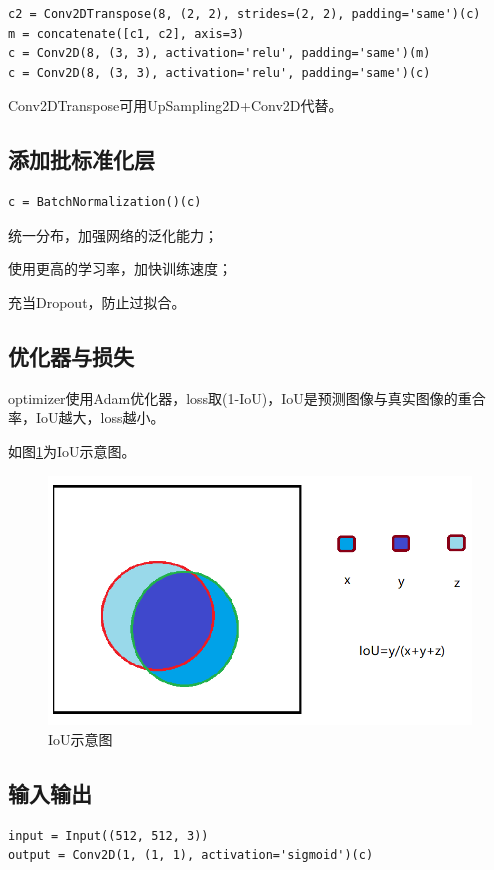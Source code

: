 \begin{lstlisting}
c2 = Conv2DTranspose(8, (2, 2), strides=(2, 2), padding='same')(c)
m = concatenate([c1, c2], axis=3)
c = Conv2D(8, (3, 3), activation='relu', padding='same')(m)
c = Conv2D(8, (3, 3), activation='relu', padding='same')(c)
\end{lstlisting}

Conv2DTranspose可用UpSampling2D+Conv2D代替。

\subsection{添加批标准化层}

\begin{lstlisting}
c = BatchNormalization()(c)
\end{lstlisting}

统一分布，加强网络的泛化能力；

使用更高的学习率，加快训练速度；

充当Dropout，防止过拟合。

\subsection{优化器与损失}

optimizer使用Adam优化器，loss取(1-IoU)，IoU是预测图像与真实图像的重合率，IoU越大，loss越小。

如图\ref{fig::model16}为IoU示意图。

\begin{figure}[htbp]
\centering
\includegraphics[width=0.6\linewidth]{body/model_pic/iou}
\caption{IoU示意图}
\label{fig::model16}
\end{figure}

\subsection{输入输出}

\begin{lstlisting}
input = Input((512, 512, 3))
output = Conv2D(1, (1, 1), activation='sigmoid')(c)
\end{lstlisting}

